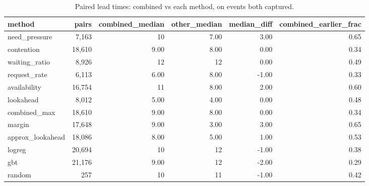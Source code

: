 \begin{table}[t]
\centering
\footnotesize
\caption{Paired lead times: combined vs each method, on events both captured.}
\label{tab:paired}
\begin{tabular}{lrrrrr}
\toprule
method & pairs & combined\_median & other\_median & median\_diff & combined\_earlier\_frac \\
\midrule
need\_pressure & 7{,}163 & 10 & 7.00 & 3.00 & 0.65 \\
contention & 18{,}610 & 9.00 & 8.00 & 0.00 & 0.34 \\
waiting\_ratio & 8{,}926 & 12 & 12 & 0.00 & 0.49 \\
request\_rate & 6{,}113 & 6.00 & 8.00 & -1.00 & 0.33 \\
availability & 16{,}754 & 11 & 8.00 & 2.00 & 0.60 \\
lookahead & 8{,}012 & 5.00 & 4.00 & 0.00 & 0.48 \\
combined\_max & 18{,}610 & 9.00 & 8.00 & 0.00 & 0.34 \\
margin & 17{,}648 & 9.00 & 3.00 & 3.00 & 0.65 \\
approx\_lookahead & 18{,}086 & 8.00 & 5.00 & 1.00 & 0.53 \\
logreg & 20{,}694 & 10 & 12 & -1.00 & 0.38 \\
gbt & 21{,}176 & 9.00 & 12 & -2.00 & 0.29 \\
random & 257 & 10 & 11 & -1.00 & 0.42 \\
\bottomrule
\end{tabular}
\end{table}

